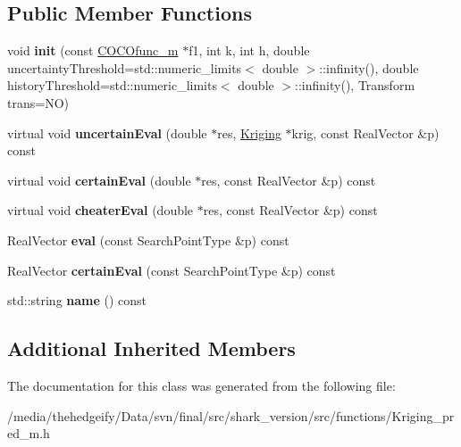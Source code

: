 \subsection*{Public Member Functions}
\begin{DoxyCompactItemize}
\item 
void {\bfseries init} (const \hyperlink{classCOCOfunc__m}{C\+O\+C\+Ofunc\+\_\+m} $\ast$f1, int k, int h, double uncertainty\+Threshold=std\+::numeric\+\_\+limits$<$ double $>$\+::infinity(), double history\+Threshold=std\+::numeric\+\_\+limits$<$ double $>$\+::infinity(), Transform trans=NO)\hypertarget{classKriging__pred__m_ac86eb1c7a6af76e95ca62150647b4985}{}\label{classKriging__pred__m_ac86eb1c7a6af76e95ca62150647b4985}

\item 
virtual void {\bfseries uncertain\+Eval} (double $\ast$res, \hyperlink{classKriging}{Kriging} $\ast$krig, const Real\+Vector \&p) const \hypertarget{classKriging__pred__m_acd2a2d874bd8288c97486a63ffb6b0d9}{}\label{classKriging__pred__m_acd2a2d874bd8288c97486a63ffb6b0d9}

\item 
virtual void {\bfseries certain\+Eval} (double $\ast$res, const Real\+Vector \&p) const \hypertarget{classKriging__pred__m_a8540f09adc04b686807a1fb66c7e8c0b}{}\label{classKriging__pred__m_a8540f09adc04b686807a1fb66c7e8c0b}

\item 
virtual void {\bfseries cheater\+Eval} (double $\ast$res, const Real\+Vector \&p) const \hypertarget{classKriging__pred__m_a19d0996cc66efa16ba8ea68b53356914}{}\label{classKriging__pred__m_a19d0996cc66efa16ba8ea68b53356914}

\item 
Real\+Vector {\bfseries eval} (const Search\+Point\+Type \&p) const \hypertarget{classKriging__pred__m_ae2afc17efb25665b85c357961a14a2a4}{}\label{classKriging__pred__m_ae2afc17efb25665b85c357961a14a2a4}

\item 
Real\+Vector {\bfseries certain\+Eval} (const Search\+Point\+Type \&p) const \hypertarget{classKriging__pred__m_add6445195c66311921fc76de987a579e}{}\label{classKriging__pred__m_add6445195c66311921fc76de987a579e}

\item 
std\+::string {\bfseries name} () const \hypertarget{classKriging__pred__m_a9717462f36284acecf24b117ecf5f917}{}\label{classKriging__pred__m_a9717462f36284acecf24b117ecf5f917}

\end{DoxyCompactItemize}
\subsection*{Additional Inherited Members}


The documentation for this class was generated from the following file\+:\begin{DoxyCompactItemize}
\item 
/media/thehedgeify/\+Data/svn/final/src/shark\+\_\+version/src/functions/Kriging\+\_\+pred\+\_\+m.\+h\end{DoxyCompactItemize}
